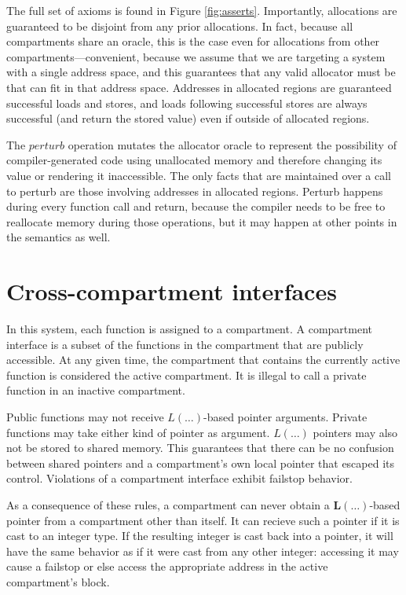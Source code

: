 \documentclass{article}
\begin{document}
The full set of axioms is found in Figure \ref{fig:asserts}. Importantly,
allocations are guaranteed to be disjoint from any prior allocations.
In fact, because all compartments share an oracle, this is the case even for
allocations from other compartments---convenient, because we assume that we are
targeting a system with a single address space, and this guarantees that any valid
allocator must be that can fit in that address space. Addresses in allocated regions
are guaranteed successful loads and stores, and loads following successful stores
are always successful (and return the stored value) even if outside of allocated
regions.

The \(\mathit{perturb}\) operation mutates the allocator oracle to represent the
possibility of compiler-generated code using unallocated memory and therefore changing
its value or rendering it inaccessible. The only facts that are maintained over a
call to perturb are those involving addresses in allocated regions. Perturb happens
during every function call and return, because the compiler needs to be free to
reallocate memory during those operations, but it may happen at other points in the
semantics as well.

\section{Cross-compartment interfaces}
\label{sec:interfaces}

In this system, each function is assigned to a compartment. A compartment interface
is a subset of the functions in the compartment that are publicly accessible.
At any given time, the compartment that contains the currently active function is
considered the active compartment. It is illegal to call a private function in an
inactive compartment.

Public functions may not receive \(L(\dots)\)-based pointer arguments.
Private functions may take either kind of pointer as argument. \(L(\dots)\) pointers
may also not be stored to shared memory. This guarantees that there can be no
confusion between shared pointers and a compartment's own local pointer that
escaped its control. Violations of a compartment interface exhibit failstop behavior.

As a consequence of these rules, a compartment can never obtain a
\(\mathbf{L}(\dots)\)-based pointer from a compartment other than itself.
It can recieve such a pointer if it is cast to an integer type. If the resulting
integer is cast back into a pointer, it will have the same behavior as if it were cast
from any other integer: accessing it may cause a failstop or else access the
appropriate address in the active compartment's block.
\end{document}
